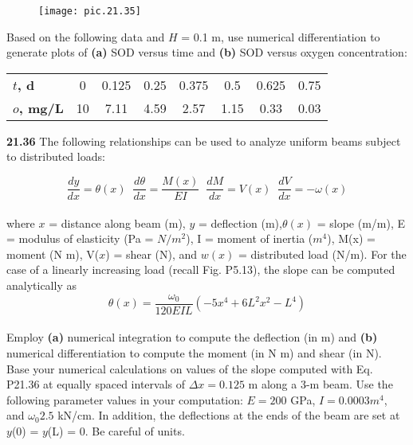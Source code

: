 \documentclass[../main.tex]{subfiles}
\begin{document}
\begin{figure}[hbt!]
	\texttt{[image: pic.21.35]}
	\label{pic.21.35}
\end{figure}
\begin{multicols}{2}

Based on the following data and $H$ = 0.1 m, use numerical differentiation to generate plots of \textbf{(a)} SOD versus
time and \textbf{(b)} SOD versus oxygen concentration:\\
\begin{tabular}{lccccccc}
	\hline

	\scriptsize{\textbf{$t$, d}} & \scriptsize{0} & \scriptsize{0.125} & \scriptsize{0.25} & \scriptsize{0.375} & \scriptsize{0.5} & \scriptsize{0.625} & \scriptsize{0.75}\\
	
	\scriptsize{\textbf{$o$, mg/L}} & \scriptsize{10} & \scriptsize{7.11} & \scriptsize{4.59} & \scriptsize{2.57} & \scriptsize{1.15} & \scriptsize{0.33} & \scriptsize{0.03}\\
	
	\hline
\end{tabular}

\textbf{21.36} The following relationships can be used to analyze
uniform beams subject to distributed loads:

{$$ \dfrac{dy}{dx} = \theta(x) \; \; \dfrac{d\theta}{dx} = \dfrac{M(x)}{EI} \; \; \dfrac{dM}{dx} = V(x) \; \; \dfrac{dV}{dx} = -\omega (x) $$}\\
where $x$ = distance along beam (m), $y$ = deflection (m),$\theta(x)$ = slope (m/m), E = modulus of elasticity (Pa = $N/m^2$),
I = moment of inertia ($m^4$), M(x) = moment (N m), V($x$) =
shear (N), and $w(x)$ = distributed load (N/m). For the case of
a linearly increasing load (recall Fig. P5.13), the slope can
be computed analytically as 
\begin{equation}
\tag{P21.36}
{\theta(x) = \dfrac{\omega_{0}}{120EIL}(-5x^4 + 6L^2x^2 - L^4)}
\end{equation}\\
Employ \textbf{(a)} numerical integration to compute the deflection
(in m) and \textbf{(b)} numerical differentiation to compute the
moment (in N m) and shear (in N). Base your numerical
calculations on values of the slope computed with
Eq. P21.36 at equally spaced intervals of $\Delta x = 0.125$ m along a 3-m beam. Use the following parameter values in
your computation: $E = 200$ GPa, $I = 0.0003 m^4$, and $\omega_{0} 2.5$ kN/cm. In addition, the deflections at the ends of the
beam are set at $y$(0) = $y$(L) = 0. Be careful of units.


\end{multicols}
\end{document}
